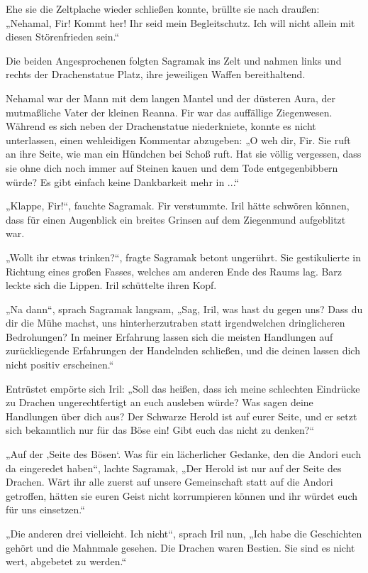 Ehe sie die Zeltplache wieder schließen konnte, brüllte sie nach draußen: „Nehamal, Fir! Kommt her! Ihr seid mein Begleitschutz. Ich will nicht allein mit diesen Störenfrieden sein.“

Die beiden Angesprochenen folgten Sagramak ins Zelt und nahmen links und rechts der Drachenstatue Platz, ihre jeweiligen Waffen bereithaltend.

Nehamal war der Mann mit dem langen Mantel und der düsteren Aura, der mutmaßliche Vater der kleinen Reanna. Fir war das auffällige Ziegenwesen. Während es sich neben der Drachenstatue niederkniete, konnte es nicht unterlassen, einen wehleidigen Kommentar abzugeben: „O weh dir, Fir. Sie ruft an ihre Seite, wie man ein Hündchen bei Schoß ruft. Hat sie völlig vergessen, dass sie ohne dich noch immer auf Steinen kauen und dem Tode entgegenbibbern würde? Es gibt einfach keine Dankbarkeit mehr in ...“

„Klappe, Fir!“, fauchte Sagramak. Fir verstummte. Iril hätte schwören können, dass für einen Augenblick ein breites Grinsen auf dem Ziegenmund aufgeblitzt war.

„Wollt ihr etwas trinken?“, fragte Sagramak betont ungerührt. Sie gestikulierte in Richtung eines großen Fasses, welches am anderen Ende des Raums lag. Barz leckte sich die Lippen. Iril schüttelte ihren Kopf.

„Na dann“, sprach Sagramak langsam, „Sag, Iril, was hast du gegen uns? Dass du dir die Mühe machst, uns hinterherzutraben statt irgendwelchen dringlicheren Bedrohungen? In meiner Erfahrung lassen sich die meisten Handlungen auf zurückliegende Erfahrungen der Handelnden schließen, und die deinen lassen dich nicht positiv erscheinen.“

Entrüstet empörte sich Iril: „Soll das heißen, dass ich meine schlechten Eindrücke zu Drachen ungerechtfertigt an euch ausleben würde? Was sagen deine Handlungen über dich aus? Der Schwarze Herold ist auf eurer Seite, und er setzt sich bekanntlich nur für das Böse ein! Gibt euch das nicht zu denken?“

„Auf der ‚Seite des Bösen‘. Was für ein lächerlicher Gedanke, den die Andori euch da eingeredet haben“, lachte Sagramak, „Der Herold ist nur auf der Seite des Drachen. Wärt ihr alle zuerst auf unsere Gemeinschaft statt auf die Andori getroffen, hätten sie euren Geist nicht korrumpieren können und ihr würdet euch für uns einsetzen.“

„Die anderen drei vielleicht. Ich nicht“, sprach Iril nun, „Ich habe die Geschichten gehört und die Mahnmale gesehen. Die Drachen waren Bestien. Sie sind es nicht wert, abgebetet zu werden.“

